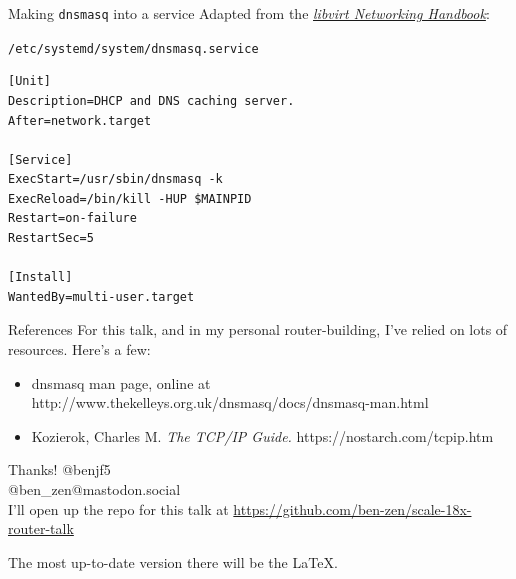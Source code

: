 \documentclass[bigger,aspectratio=169]{beamer}
\begin{document}
\begin{frame}[fragile]{Making \texttt{dnsmasq} into a service}
  Adapted from the \href{https://jamielinux.com/docs/libvirt-networking-handbook/appendix/run-dnsmasq-with-systemd.html}{\textit{libvirt Networking Handbook}}:
  \begin{block}{\texttt{/etc/systemd/system/dnsmasq.service}}
\begin{verbatim}
[Unit]
Description=DHCP and DNS caching server.
After=network.target

[Service]
ExecStart=/usr/sbin/dnsmasq -k
ExecReload=/bin/kill -HUP $MAINPID
Restart=on-failure
RestartSec=5

[Install]
WantedBy=multi-user.target
\end{verbatim}
  \end{block}
\end{frame}

\begin{frame}{References}
  For this talk, and in my personal router-building, I've relied on lots of
  resources. Here's a few:
  \begin{itemize}
  \item dnsmasq man page, online at http://www.thekelleys.org.uk/dnsmasq/docs/dnsmasq-man.html
  \item Kozierok, Charles M. \textit{The TCP/IP Guide.} https://nostarch.com/tcpip.htm
  \end{itemize}
\end{frame}

\begin{frame}{Thanks!}
  \faTwitter @benjf5\\
  \faMastodon @ben\_zen@mastodon.social\\

  I'll open up the repo for this talk at \url{https://github.com/ben-zen/scale-18x-router-talk}

  The most up-to-date version there will be the \LaTeX.

\end{frame}
\end{document}
